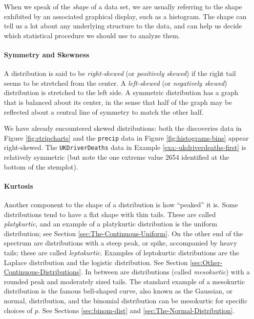 \documentclass[captions=tableheading]{scrbook}
\begin{document}
\label{sub:Shape}

When we speak of the \emph{shape} of a data set, we are usually referring to the shape exhibited by an associated graphical display, such as a histogram. The shape can tell us a lot about any underlying structure to the data, and can help us decide which statistical procedure we should use to analyze them.

\paragraph*{Symmetry and Skewness}

A distribution is said to be \emph{right-skewed} (or \emph{positively skewed}) if the right tail seems to be stretched from the center. A \emph{left-skewed} (or \emph{negatively skewed}) distribution is stretched to the left side. A symmetric distribution has a graph that is balanced about its center, in the sense that half of the graph may be reflected about a central line of symmetry to match the other
half.

We have already encountered skewed distributions: both the discoveries data in Figure \ref{fig:stripcharts} and the \texttt{precip} data in Figure \ref{fig:histograms-bins} appear right-skewed. The \texttt{UKDriverDeaths} data in Example \ref{exa:-ukdriverdeaths-first} is relatively symmetric (but note the one extreme value 2654 identified at the bottom of the stemplot).

\paragraph*{Kurtosis}

Another component to the shape of a distribution is how ``peaked'' it is. Some distributions tend to have a flat shape with thin tails. These are called \emph{platykurtic}, and an example of a platykurtic distribution is the uniform distribution; see Section \ref{sec:The-Continuous-Uniform}. On the other end of the spectrum are distributions with a steep peak, or spike, accompanied by heavy tails; these are called \emph{leptokurtic}. Examples of leptokurtic distributions are the Laplace distribution and the logistic distribution. See Section \ref{sec:Other-Continuous-Distributions}. In between are distributions (called \emph{mesokurtic}) with a rounded peak and moderately sized tails. The standard example of a mesokurtic distribution is the famous bell-shaped curve, also known as the Gaussian, or normal, distribution, and the binomial distribution can be mesokurtic for specific choices of \(p\). See Sections \ref{sec:binom-dist} and \ref{sec:The-Normal-Distribution}.
\end{document}
